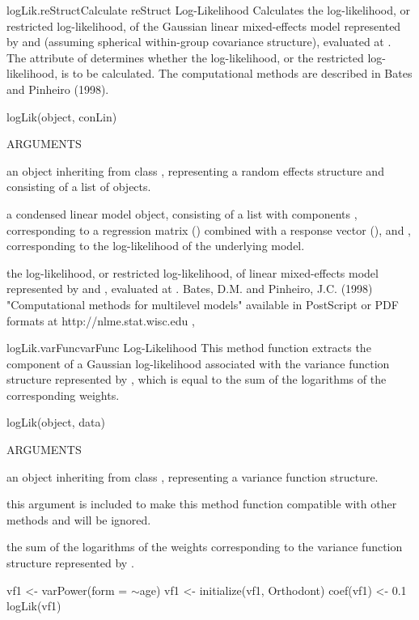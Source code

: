 \documentclass[pdftex]{article} \usepackage{url,graphicx}
\renewcommand{\Twiddle}{\mbox{\(\sim\)}}
\begin{document}
\begin{Helpfile}{logLik.reStruct}{Calculate reStruct Log-Likelihood}
Calculates the log-likelihood, or restricted log-likelihood, of the
Gaussian linear mixed-effects model represented by  and
 (assuming spherical within-group covariance structure),
evaluated at . The  attribute of
 determines whether the log-likelihood, or the restricted
log-likelihood, is to be calculated. The computational methods are 
described in Bates and Pinheiro (1998).
\begin{Example}
logLik(object, conLin)
\end{Example}
\begin{Argument}{ARGUMENTS}
\item[\Co{object:}]
an object inheriting from class ,
representing a random effects structure and consisting of a list of
 objects.
\item[\Co{conLin:}]
a condensed linear model object, consisting of a list
with components , corresponding to a regression matrix
() combined with a response vector (), and
, corresponding to the log-likelihood of the
underlying model.
\end{Argument}
the log-likelihood, or restricted log-likelihood, of linear
mixed-effects model represented by  and ,
evaluated at .
Bates, D.M. and Pinheiro, J.C. (1998) "Computational methods for
multilevel models" available in PostScript or PDF formats at
http://nlme.stat.wisc.edu
, 
\end{Helpfile}
\begin{Helpfile}{logLik.varFunc}{varFunc Log-Likelihood}
This method function extracts the component of a Gaussian
log-likelihood associated with the variance function structure
represented by , which is equal to the sum of the
logarithms of the corresponding weights.
\begin{Example}
logLik(object, data)
\end{Example}
\begin{Argument}{ARGUMENTS}
\item[\Co{object:}]
an object inheriting from class ,
representing a variance function structure.
\item[\Co{data:}]
this argument is included to make this method function
compatible with other  methods and will be ignored.
\end{Argument}
the sum of the logarithms of the weights corresponding to the variance
function structure represented by .
\need 15pt
\vspace{-16pt} 
\begin{Example}
vf1 <- varPower(form = \Twiddle age)
vf1 <- initialize(vf1, Orthodont)
coef(vf1) <- 0.1
logLik(vf1)
\end{Example}
\end{Helpfile}
\end{document}
